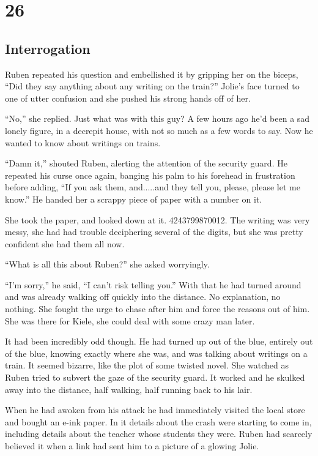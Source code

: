 \chapter{26}
\section{Interrogation}


Ruben repeated his question and embellished it by gripping her on the biceps, ``Did they say anything about any writing on the train?''  Jolie's face turned to one of utter confusion and she pushed his strong hands off of her.

``No,'' she replied.  Just what was with this guy?  A few hours ago he'd been a sad lonely figure, in a decrepit house, with not so much as  a few words to say.  Now he wanted to know about writings on trains.  

``Damn it,'' shouted Ruben, alerting the attention of the security guard.  He repeated his curse once again, banging his palm to his forehead in frustration before adding, ``If you ask them, and.....and they tell you, please, please let me know.''  He handed her a scrappy piece of paper with a number on it.  

She took the paper, and looked down at it.  4243799870012.  The writing was very messy, she had had trouble deciphering several of the digits, but she was pretty confident she had them all now.  

``What is all this about Ruben?'' she asked worryingly.

``I'm sorry,'' he said, ``I can't risk telling you.''  With that he had turned around and was already walking off quickly into the distance.  No explanation, no nothing.  She fought the urge to chase after him and force the reasons out of him.  She was there for Kiele, she could deal with some crazy man later.

It had been incredibly odd though.  He had turned up out of the blue, entirely out of the blue, knowing exactly where she was, and was talking about writings on a train.  It seemed bizarre, like the plot of some twisted novel.  She watched as Ruben tried to subvert the gaze of the security guard.  It worked and he skulked away into the distance, half walking, half running back to his lair. 

When he had awoken from his attack he had immediately visited the local store and bought an e-ink paper.  In it details about the crash were starting to come in, including details about the teacher whose students they were.  Ruben had scarcely believed it when a link had sent him to a picture of a glowing Jolie.  

